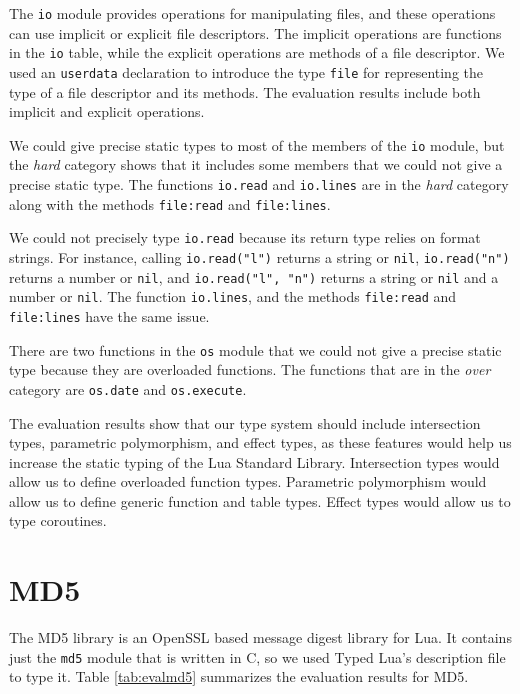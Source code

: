 The \texttt{io} module provides operations for manipulating files,
and these operations can use implicit or explicit file descriptors.
The implicit operations are functions in the \texttt{io} table,
while the explicit operations are methods of a file descriptor.
We used an \texttt{userdata} declaration to introduce the type
\texttt{file} for representing the type of a file descriptor
and its methods.
The evaluation results include both implicit and explicit operations.

We could give precise static types to most of the members of the
\texttt{io} module, but the \emph{hard} category shows that it
includes some members that we could not give a precise static type.
The functions \texttt{io.read} and \texttt{io.lines} are
in the \emph{hard} category along with the methods
\texttt{file:read} and \texttt{file:lines}.

We could not precisely type \texttt{io.read} because its return type
relies on format strings.
For instance, calling \texttt{io.read("l")} returns a string or \texttt{nil},
\texttt{io.read("n")} returns a number or \texttt{nil}, and
\texttt{io.read("l", "n")} returns a string or \texttt{nil} and a number or \texttt{nil}.
The function \texttt{io.lines}, and the methods \texttt{file:read} and
\texttt{file:lines} have the same issue.

There are two functions in the \texttt{os} module that we could
not give a precise static type because they are overloaded functions.
The functions that are in the \emph{over} category are
\texttt{os.date} and \texttt{os.execute}.

The evaluation results show that our type system should include
intersection types, parametric polymorphism, and effect types,
as these features would help us increase the static typing of the
Lua Standard Library.
Intersection types would allow us to define overloaded function types.
Parametric polymorphism would allow us to define generic function and table types.
Effect types would allow us to type coroutines.

\section{MD5}

The MD5 library is an OpenSSL based message digest library for Lua.
It contains just the \texttt{md5} module that is written in C,
so we used Typed Lua's description file to type it.
Table \ref{tab:evalmd5} summarizes the evaluation results for MD5.


